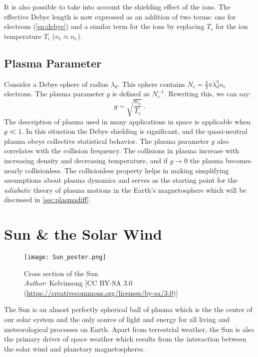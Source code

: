 It is also possible to take into account the shielding effect of the ions. The effective Debye 
length is now expressed as an addition of two terms: one for electrons (\cref{eq:debye}) and a 
similar term for the ions by replacing $T_e$ for the ion temperature $T_i$ ($n_i \approx n_e$). 

\subsection*{Plasma Parameter}

Consider a Debye sphere of radius $\lambda_d$. This sphere contains 
$N_e = \frac{4}{3}\pi \lambda^3_d n_e$ electrons. The plasma parameter $g$ is defined as 
$N_{e}^{-1}$. Rewriting this, we can say:
%
\[
    g \sim \sqrt{\frac{n_e}{T_e}} \ .
\]
%
The description of plasma used in many applications in space is applicable when $g \ll 1$. In 
this situation the Debye shielding is significant, and the quasi-neutral plasma obeys collective 
statistical behavior. The plasma parameter $g$ also correlates with the collision frequency. The 
collisions in plasma increase with increasing density and decreasing temperature, and if 
$g \longrightarrow 0$ the plasma becomes nearly collisionless. The collisionless property helps in 
making simplifying assumptions about plasma dynamics and serves as the starting point for the 
\emph{adiabatic} theory of plasma motions in the Earth's magnetosphere which will be discussed in 
\cref{sec:plasmadiff}.

\section{Sun \& the Solar Wind}\label{sec:solar}

\begin{figure}
    \noindent\centering\texttt{[image: Sun\_poster.png]}
    \caption{{\small Cross section of the Sun \\ 
    \textit{Author}: Kelvinsong [CC BY-SA 3.0 (\url{https://creativecommons.org/licenses/by-sa/3.0})]}}
    \label{fig:SunLayers}
\end{figure}

The Sun is an almost perfectly spherical ball of plasma which is the the center of our solar 
system and the only source of light and energy for all living and meteorological processes on 
Earth. Apart from terrestrial weather, the Sun is also the primary driver of space weather which 
results from the interaction between the solar wind and planetary magnetospheres.

